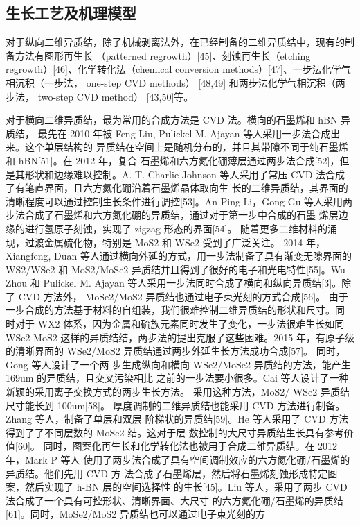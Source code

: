 \subsection{生长工艺及机理模型}
对于纵向二维异质结，除了机械剥离法外，在已经制备的二维异质结中，现有的制备方法有图形再生长
（patterned regrowth）[45]、刻蚀再生长（etching regrowth）[46]、化学转化法（chemical 
conversion methods）[47]、一步法化学气相沉积（一步法， one-step CVD methods） [48,49]
和两步法化学气相沉积（两步法， two-step CVD method） [43,50]等。

对于横向二维异质结，最为常用的合成方法是 CVD 法。横向的石墨烯和 hBN 异质结，
最先在 2010 年被 Feng Liu, Pulickel M. Ajayan 等人采用一步法合成出来。这个单层结构的
异质结在空间上是随机分布的，并且其带隙不同于纯石墨烯和 hBN[51]。在 2012 年，复合
石墨烯和六方氮化硼薄层通过两步法合成[52]，但是其形状和边缘难以控制。A. T. Charlie 
Johnson 等人采用了常压 CVD 法合成了有笔直界面，且六方氮化硼沿着石墨烯晶体取向生
长的二维异质结，其界面的清晰程度可以通过控制生长条件进行调控[53]。An-Ping Li，Gong 
Gu 等人采用两步法合成了石墨烯和六方氮化硼的异质结，通过对于第一步中合成的石墨
烯层边缘的进行氢原子刻蚀，实现了 zigzag 形态的界面[54]。
随着更多二维材料的涌现，过渡金属硫化物，特别是 MoS2 和 WSe2 受到了广泛关注。
2014 年，Xiangfeng, Duan 等人通过横向外延的方式，用一步法制备了具有渐变无隙界面的
WS2/WSe2 和 MoS2/MoSe2 异质结并且得到了很好的电子和光电特性[55]。Wu Zhou 和
Pulickel M. Ajayan 等人采用一步法同时合成了横向和纵向异质结[3]。除了 CVD 方法外，
MoSe2/MoS2 异质结也通过电子束光刻的方式合成[56]。
由于一步合成的方法基于材料的自组装，我们很难控制二维异质结的形状和尺寸。同
时对于 WX2 体系，因为金属和硫族元素同时发生了变化，一步法很难生长如同 WSe2-MoS2
这样的异质结结，两步法的提出克服了这些困难。2015 年，有原子级的清晰界面的
WSe2/MoS2 异质结通过两步外延生长方法成功合成[57]。 同时，Gong 等人设计了一个两
步生成纵向和横向 WSe2/MoSe2 异质结的方法，能产生 169um 的异质结，且交叉污染相比
之前的一步法要小很多。Cai 等人设计了一种新颖的采用离子交换方式的两步生长方法。
采用这种方法，MoS2/ WSe2 异质结尺寸能长到 100um[58]。
厚度调制的二维异质结也能采用 CVD 方法进行制备。Zhang 等人，制备了单层和双层
阶梯状的异质结[59]。He 等人采用了 CVD 方法得到了了不同层数的 MoSe2 结。这对于层
数控制的大尺寸异质结生长具有参考价值[60]。
同时，图案化再生长和化学转化法也被用于合成二维异质结。在 2012 年，Mark P 等人
使用了两步法合成了具有空间调制效应的六方氮化硼/石墨烯的异质结。他们先用 CVD 方
法合成了石墨烯层，然后将石墨烯刻蚀形成特定图案，然后实现了 h-BN 层的空间选择性
的生长[45]。Liu 等人，采用了两步 CVD 法合成了一个具有可控形状、清晰界面、大尺寸
的六方氮化硼/石墨烯的异质结[61]。同时，MoSe2/MoS2 异质结也可以通过电子束光刻的方
